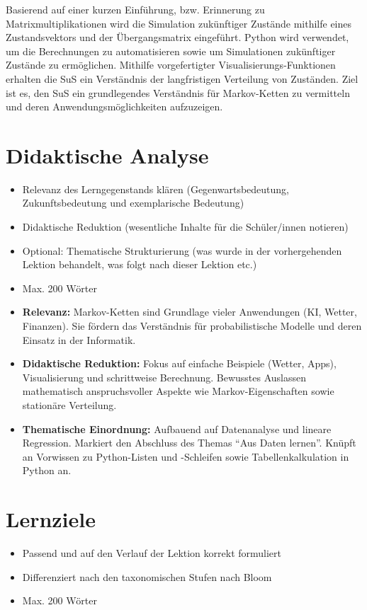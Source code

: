 Basierend auf einer kurzen Einführung, bzw. Erinnerung zu Matrixmultiplikationen wird die Simulation zukünftiger Zustände mithilfe eines Zustandsvektors und der Übergangsmatrix eingeführt. Python wird verwendet, um die Berechnungen zu automatisieren sowie um Simulationen zukünftiger Zustände zu ermöglichen. Mithilfe vorgefertigter Visualisierungs-Funktionen erhalten die SuS ein Verständnis der langfristigen Verteilung von Zuständen. Ziel ist es, den SuS ein grundlegendes Verständnis für Markov-Ketten zu vermitteln und deren Anwendungsmöglichkeiten aufzuzeigen.

\section*{Didaktische Analyse}
\begin{tcolorbox}[colback=gray!10, colframe=gray!80!black, title={Anforderungen}]
    \begin{itemize}
        \item Relevanz des Lerngegenstands klären (Gegenwartsbedeutung, Zukunftsbedeutung und exemplarische Bedeutung)
        \item Didaktische Reduktion (wesentliche Inhalte für die Schüler/innen notieren)
        \item Optional: Thematische Strukturierung (was wurde in der vorhergehenden Lektion behandelt, was folgt nach dieser Lektion etc.)
        \item Max. 200 Wörter
    \end{itemize}
\end{tcolorbox}
\begin{itemize}
    \item \textbf{Relevanz:} Markov-Ketten sind Grundlage vieler Anwendungen (KI, Wetter, Finanzen). Sie fördern das Verständnis für probabilistische Modelle und deren Einsatz in der Informatik.
    \item \textbf{Didaktische Reduktion:} Fokus auf einfache Beispiele (Wetter, Apps), Visualisierung und schrittweise Berechnung. Bewusstes Auslassen mathematisch anspruchsvoller Aspekte wie Markov-Eigenschaften sowie stationäre Verteilung.
    \item \textbf{Thematische Einordnung:} Aufbauend auf Datenanalyse und lineare Regression. Markiert den Abschluss des Themas \enquote{Aus Daten lernen}. Knüpft an Vorwissen zu Python-Listen und -Schleifen sowie Tabellenkalkulation in Python an.
\end{itemize}

\section*{Lernziele}
\begin{tcolorbox}[colback=gray!10, colframe=gray!80!black, title=Anforderungen]
    \begin{itemize}
        \item Passend und auf den Verlauf der Lektion korrekt formuliert
        \item Differenziert nach den taxonomischen Stufen nach Bloom 
        \item Max. 200 Wörter
    \end{itemize}
\end{tcolorbox}

